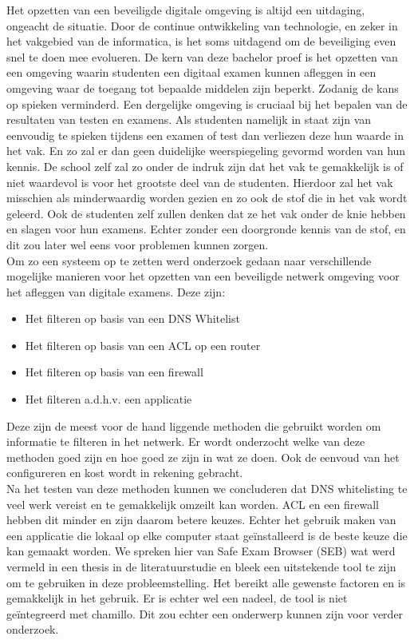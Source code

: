 Het opzetten van een beveiligde digitale omgeving is altijd een uitdaging, ongeacht de situatie. Door de continue ontwikkeling van technologie, en zeker in het vakgebied van de informatica, is het soms uitdagend om de beveiliging even snel te doen mee evolueren. De kern van deze bachelor proef is het opzetten van een omgeving waarin studenten een digitaal examen kunnen afleggen in een omgeving waar de toegang tot bepaalde middelen zijn beperkt. Zodanig de kans op spieken verminderd. Een dergelijke omgeving is cruciaal bij het bepalen van de resultaten van testen en examens. Als studenten namelijk in staat zijn van eenvoudig te spieken tijdens een examen of test dan verliezen deze hun waarde in het vak. En zo zal er dan geen duidelijke weerspiegeling gevormd worden van hun kennis.
De school zelf zal zo onder de indruk zijn dat het vak te gemakkelijk is of niet waardevol is voor het grootste deel van de studenten. Hierdoor zal het vak misschien als minderwaardig worden gezien en zo ook de stof die in het vak wordt geleerd. Ook de studenten zelf zullen denken dat ze het vak onder de knie hebben en slagen voor hun examens. Echter zonder een doorgronde kennis van de stof, en dit zou later wel eens voor problemen kunnen zorgen. \\
Om zo een systeem op te zetten werd onderzoek gedaan naar verschillende mogelijke manieren voor het opzetten van een beveiligde netwerk omgeving voor het afleggen van digitale examens. Deze zijn:
\begin{itemize}
\item Het filteren op basis van een DNS Whitelist
\item Het filteren op basis van een ACL op een router
\item Het filteren op basis van een firewall
\item Het filteren a.d.h.v. een applicatie
\end{itemize}
Deze zijn de meest voor de hand liggende methoden die gebruikt worden om informatie te filteren in het netwerk. Er wordt onderzocht welke van deze methoden goed zijn en hoe goed ze zijn in wat ze doen. Ook de eenvoud van het configureren en kost wordt in rekening gebracht. \\
Na het testen van deze methoden kunnen we concluderen dat DNS whitelisting te veel werk vereist en te gemakkelijk omzeilt kan worden. ACL en een firewall hebben dit minder en zijn daarom betere keuzes. Echter het gebruik maken van een applicatie die lokaal op elke computer staat geïnstalleerd is de beste keuze die kan gemaakt worden. We spreken hier van Safe Exam Browser (SEB) wat werd vermeld in een thesis in de literatuurstudie en bleek een uitstekende tool te zijn om te gebruiken in deze probleemstelling. Het bereikt alle gewenste factoren en is gemakkelijk in het gebruik. Er is echter wel een nadeel, de tool is niet geïntegreerd met chamillo. Dit zou echter een onderwerp kunnen zijn voor verder onderzoek.



